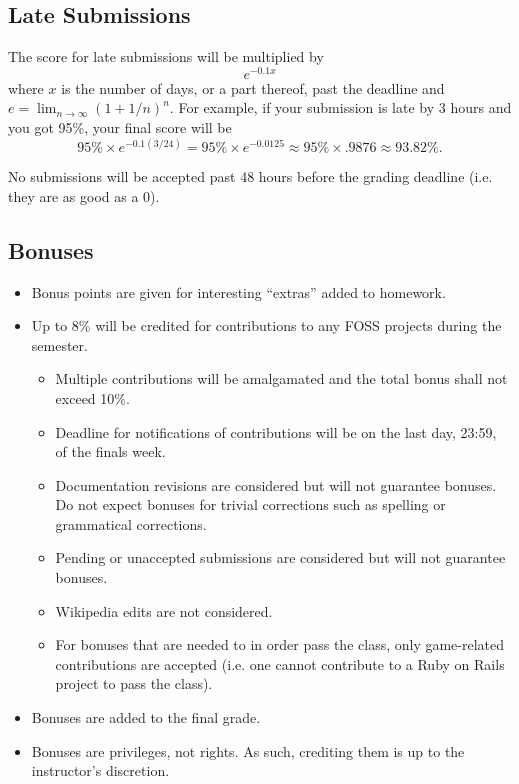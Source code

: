 \documentclass[10pt]{article}
\begin{document}
\subsection{Late Submissions}
The score for late submissions will be multiplied by
$$
e^{-0.1x}
$$
where $x$ is the number of days, or a part thereof, past the deadline and $e = \lim_{n\rightarrow\infty}(1 + 1/n)^n$. For example, if your submission is late by 3 hours and you got 95\%, your final score will be
$$
95\% \times e^{-0.1(3/24)} = 95\% \times e^{-0.0125} \approx 95\% \times .9876 \approx 93.82\%.
$$

No submissions will be accepted past 48 hours before the grading deadline (i.e. they are as good as a 0).

\subsection{Bonuses}
\begin{itemize}[noitemsep]
\item Bonus points are given for interesting ``extras'' added to homework.
\item Up to 8\% will be credited for contributions to any FOSS projects during the semester.
	\begin{itemize}[noitemsep]
		\item Multiple contributions will be amalgamated and the total bonus shall not exceed 10\%.
		\item Deadline for notifications of contributions will be on the last day, 23:59, of the finals week.
		\item Documentation revisions are considered but will not guarantee bonuses. Do not expect bonuses for trivial corrections such as spelling or grammatical corrections.
		\item Pending or unaccepted submissions are considered but will not guarantee bonuses.
		\item Wikipedia edits are not considered.
		\item For bonuses that are needed to in order pass the class, only game-related contributions are accepted (i.e. one cannot contribute to a Ruby on Rails project to pass the class).
	\end{itemize}
\item Bonuses are added to the final grade.
\item Bonuses are privileges, not rights. As such, crediting them is up to the instructor's discretion.
\end{itemize}
\end{document}
